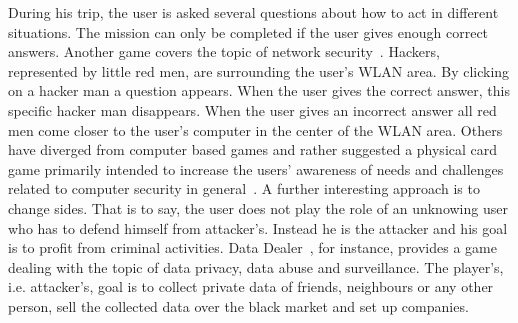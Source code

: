 During his trip, the user is asked several questions about how to act in different situations. 
The mission can only be completed if the user gives enough correct answers.
Another game covers the topic of network security~\cite{wirelesshackers}. 
Hackers, represented by little red men, are surrounding the user's WLAN area. 
By clicking on a hacker man a question appears. 
When the user gives the correct answer, this specific hacker man disappears. 
When the user gives an incorrect answer all red men come closer to the user's computer in the center of the WLAN area.
Others have diverged from computer based games and rather suggested a physical card game primarily intended to increase the users' awareness of needs and challenges related to computer security in general~\cite{denning2013controlalthack}.
A further interesting approach is to change sides.
That is to say, the user does not play the role of an unknowing user who has to defend himself from attacker's.
Instead he is the attacker and his goal is to profit from criminal activities.
Data Dealer~\cite{datadealer}, for instance, provides a game dealing with the topic of data privacy, data abuse and surveillance.
The player's, i.e. attacker's, goal is to collect private data of friends, neighbours or any other person, sell the collected data over the black market and set up companies.







 

